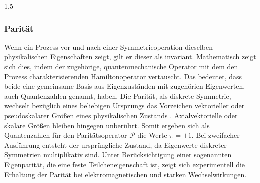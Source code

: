 \documentclass[11pt,a4paper,twoside]{report}
\begin{document}
\begin{spacing}{1,5}
\subsubsection{Parität}
\label{sec_parity}
Wenn ein Prozess vor und nach einer Symmetrieoperation dieselben physikalischen Eigenschaften zeigt, gilt er dieser als invariant. Mathematisch zeigt sich
dies, indem der zugehörige, quantenmechanische Operator mit dem den Prozess charakterisierenden Hamiltonoperator vertauscht. Das bedeutet, dass beide eine
gemeinsame Basis aus Eigenzuständen mit zugehörien Eigenwerten, auch Quantenzahlen genannt, haben. Die Parität, als diskrete Symmetrie, wechselt bezüglich 
eines beliebigen Ursprungs das Vorzeichen vektorieller oder pseudoskalarer Größen eines physikalischen Zustands \cite{Klapdor}. Axialvektorielle oder skalare Größen bleiben
hingegen unberührt. Somit ergeben sich als Quantenzahlen für den Paritätsoperator $\mathcal{P}$ die Werte $\pi = \pm1$. Bei zweifacher Ausführung entsteht 
der ursprüngliche Zustand, da Eigenwerte diskreter Symmetrien multiplikativ sind. Unter Berücksichtigung einer sogenannten Eigenparität, die eine feste
Teilcheneigenschaft ist, zeigt sich experimentell die Erhaltung der Parität bei elektromagnetischen und starken Wechselwirkungen.


\end{spacing}
\end{document}
